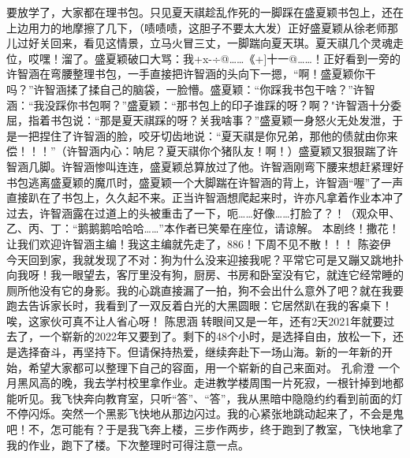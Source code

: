 {}要放学了，大家都在理书包。只见夏天祺趁乱作死的一脚踩在盛夏颖书包上，还在上边用力的地摩擦了几下，（啧啧啧，这胆子不要太大发）正好盛夏颖从徐老师那儿过好关回来，看见这情景，立马火冒三丈，一脚踹向夏天琪。夏天祺几个灵魂走位，哎嘿！溜了。盛夏颖破口大骂：我+x-÷@……《+]十一@……！正好看到一旁的许智涵在弯腰整理书包，一手直接把许智涵的头向下一摁，“啊！盛夏颖你干吗？”许智涵揉了揉自己的脑袋，一脸懵。盛夏颖：“你踩我书包干啥？”许智涵：“我没踩你书包啊？”盛夏颖：“那书包上的印子谁踩的呀？啊？"许智涵十分委屈，指着书包说：“那是夏天祺踩的呀？关我啥事？”盛夏颖一身怒火无处发泄，于是一把捏住了许智涵的脸，咬牙切齿地说：“夏天祺是你兄弟，那他的债就由你来偿！！！”（许智涵内心：呐尼？夏天祺你个猪队友！啊！）盛夏颖又狠狠踹了许智涵几脚。许智涵惨叫连连，盛夏颖总算放过了他。许智涵刚弯下腰来想赶紧理好书包逃离盛夏颖的魔爪时，盛夏颖一个大脚踹在许智涵的背上，许智涵“喔”了一声直接趴在了书包上，久久起不来。正当许智涵想爬起来时，许亦凡拿着作业本冲了过去，许智涵露在过道上的头被重击了一下，呃……好像……打脸了？！（观众甲、乙、丙、丁：“鹅鹅鹅哈哈哈……”本作者已笑晕在座位，请谅解。\markdownRendererInterblockSeparator
{}本剧终！撒花！\markdownRendererInterblockSeparator
{}让我们欢迎许智涵主编！我这主编就先走了，886！下周不见不散！！！\markdownRendererInterblockSeparator
{}\markdownRendererInterblockSeparator
{}陈姿伊\markdownRendererInterblockSeparator
{}今天回到家，我就发现了不对：狗为什么没来迎接我呢？平常它可是又蹦又跳地扑向我呀！我一眼望去，客厅里没有狗，厨房、书房和卧室没有它，就连它经常睡的厕所他没有它的身影。我的心跳直接漏了一拍，狗不会出什么意外了吧？就在我要跑去告诉家长时，我看到了一双反着白光的大黑圆眼：它居然趴在我的客桌下！唉，这家伙可真不让人省心呀！\markdownRendererInterblockSeparator
{}\markdownRendererInterblockSeparator
{}陈思涵\markdownRendererInterblockSeparator
{}转眼间又是一年，还有2天2021年就要过去了，一个崭新的2022年又要到了。剩下的48个小时，是选择自由，放松一下，还是选择奋斗，再坚持下。但请保持热爱，继续奔赴下一场山海。新的一年新的开始，希望大家都可以整理下自己的容面，用一个崭新的自己来面对。\markdownRendererInterblockSeparator
{}\markdownRendererInterblockSeparator
{}孔俞澄\markdownRendererInterblockSeparator
{}一个月黑风高的晚，我去学村校里拿作业。走进教学楼周围一片死寂，一根针掉到地都能听见。我飞快奔向教育室，只听“答”、“答”，我从黑暗中隐隐约约看到前面的灯不停闪烁。突然一个黑影飞快地从那边闪过。我的心紧张地跳动起来了，不会是鬼吧！不，怎可能有？于是我飞奔上楼，三步作两步，终于跑到了教室，飞快地拿了我的作业，跑下了楼。下次整理时可得注意一点。\markdownRendererInterblockSeparator
